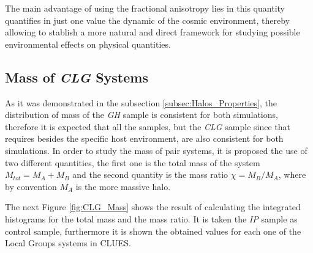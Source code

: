The main advantage of using the fractional anisotropy lies in this 
quantity quantifies in just one value the dynamic of the cosmic 
environment, thereby allowing to stablish a more natural and direct 
framework for studying possible environmental effects on physical 
quantities.



	\subsection{Mass of \textit{CLG} Systems}
	\label{subsec:CLG_Mass}


As it was demonstrated in the subsection \ref{subsec:Halos_Properties},
the distribution of mass of the \textit{GH} sample is consistent for both
simulations, therefore it is expected that all the samples, but the 
\textit{CLG} sample since that requires besides the specific host 
environment, are also consistent for both simulations. In order to study
the mass of pair systems, it is proposed the use of two different 
quantities, the first one is the total mass of the system $M_{tot} = 
M_A + M_B$ and the second quantity is the mass ratio $\chi = M_B/M_A$,
where by convention $M_A$ is the more massive halo.


The next Figure \ref{fig:CLG_Mass} shows the result of calculating the
integrated histograms for the total mass and the mass ratio. It is taken
the \textit{IP} sample as control sample, furthermore it is shown the 
obtained values for each one of the Local Groups systems in CLUES.


